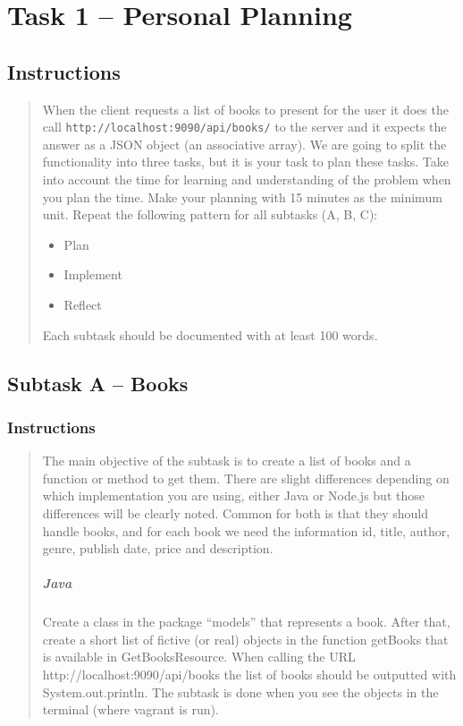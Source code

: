 \section{Task 1 -- Personal Planning}\label{task-1-personal-planning}

\subsection{Instructions}\label{instructions}

\begin{quote}
When the client requests a list of books to present for the user it does
the call \texttt{http://localhost:9090/api/books/} to the server and it
expects the answer as a JSON object (an associative array). We are going
to split the functionality into three tasks, but it is your task to plan
these tasks. Take into account the time for learning and understanding
of the problem when you plan the time. Make your planning with 15
minutes as the minimum unit. Repeat the following pattern for all
subtasks (A, B, C):

\begin{itemize}
\tightlist
\item
  Plan
\item
  Implement
\item
  Reflect
\end{itemize}

Each subtask should be documented with at least 100 words.
\end{quote}

\subsection{Subtask A -- Books}\label{subtask-a-books}

\subsubsection{Instructions}\label{instructions-1}

\begin{quote}
The main objective of the subtask is to create a list of books and a
function or method to get them. There are slight differences depending
on which implementation you are using, either Java or Node.js but those
differences will be clearly noted. Common for both is that they should
handle books, and for each book we need the information id, title,
author, genre, publish date, price and description.

\mbox{}%
\subparagraph{Java}\label{java}

Create a class in the package ``models'' that represents a book. After
that, create a short list of fictive (or real) objects in the function
getBooks that is available in GetBooksResource. When calling the URL
http://localhost:9090/api/books the list of books should be outputted
with System.out.println. The subtask is done when you see the objects in
the terminal (where vagrant is run).
\end{quote}

